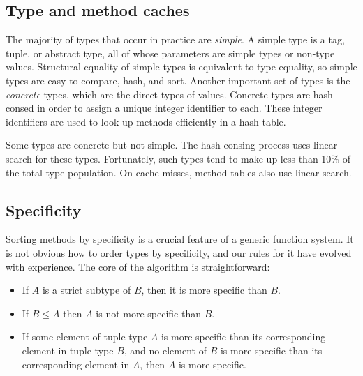 \subsection{Type and method caches}

The majority of types that occur in practice are \emph{simple}.
A simple type is a tag, tuple, or abstract type, all of whose parameters
are simple types or non-type values.
Structural equality of simple types is equivalent to type equality,
so simple types are easy to compare, hash, and sort.
Another important set of types is the \emph{concrete} types, which
are the direct types of values.
Concrete types are hash-consed in order to assign a unique integer
identifier to each.
These integer identifiers are used to look up methods efficiently
in a hash table.

Some types are concrete but not simple.
The hash-consing process uses linear search for these types.
Fortunately, such types tend to make up less than 10\% of the total
type population.
On cache misses, method tables also use linear search.


\subsection{Specificity}

Sorting methods by specificity is a crucial feature of a generic
function system.
It is not obvious how to order types by specificity, and our
rules for it have evolved with experience.
The core of the algorithm is straightforward:

\begin{itemize}
\item If $A$ is a strict subtype of $B$, then it is more specific than $B$.
\item If $B\leq A$ then $A$ is not more specific than $B$.
\item If some element of tuple type $A$ is more specific than its corresponding
element in tuple type $B$, and no element of $B$ is more specific than its
corresponding element in $A$, then $A$ is more specific.
\end{itemize}


